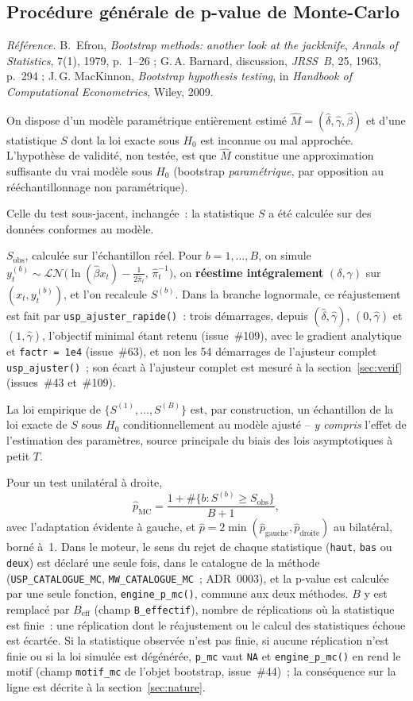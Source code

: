\documentclass[a4paper,11pt]{article}
\newcommand{\code}[1]{\texttt{\small #1}}
\newcommand{\refl}[1]{{\small\textcolor{maincolor!70!black}{\textit{Référence.} #1}}\par\smallskip}
\newcounter{ficheid}
\newenvironment{fiche}[1]{%
  \stepcounter{ficheid}%
  \phantomsection
  \subsection{#1}%
  \label{fiche:\theficheid}%
}{%
  \end{description}\vspace{0.5em}%
}
\newcommand{\Cadre}{%
  \begin{description}[leftmargin=0pt, style=unboxed, itemsep=3pt, topsep=3pt, parsep=2pt]%
  \item[\textcolor{financeblue}{\textbf{1. Cadre, notations et hypothèses de validité (non testées).}}]}
\newcommand{\Hzero}{\item[\textcolor{financeblue}{\textbf{2. Hypothèse nulle.}}]}
\newcommand{\Stat}{\item[\textcolor{financeblue}{\textbf{3. Statistique de test.}}]}
\newcommand{\Loi}{\item[\textcolor{financeblue}{\textbf{4. Loi sous $H_0$.}}]}
\newcommand{\Pval}{\item[\textcolor{financeblue}{\textbf{5. p-value.}}]}
\begin{document}
\begin{fiche}{Procédure générale de p-value de Monte-Carlo}
\label{fiche:procedure-mc}%
\refl{B.~Efron, \emph{Bootstrap methods: another look at the jackknife}, \emph{Annals of
Statistics}, 7(1), 1979, p.~1--26 ; G.\,A. Barnard, discussion, \emph{JRSS~B}, 25, 1963, p.~294 ;
J.\,G. MacKinnon, \emph{Bootstrap hypothesis testing}, in \emph{Handbook of Computational
Econometrics}, Wiley, 2009.}
\Cadre
On dispose d'un modèle paramétrique entièrement estimé
$\widehat{M} = (\hat\delta,\hat\gamma,\hat\beta)$ et d'une statistique $S$ dont la loi exacte sous
$H_0$ est inconnue ou mal approchée. L'hypothèse de validité, non testée, est que $\widehat{M}$
constitue une approximation suffisante du vrai modèle sous $H_0$ (bootstrap \emph{paramétrique},
par opposition au rééchantillonnage non paramétrique).
\Hzero
Celle du test sous-jacent, inchangée~: la statistique $S$ a été calculée sur des données conformes
au modèle.
\Stat
$S_{\text{obs}}$, calculée sur l'échantillon réel. Pour $b = 1,\dots,B$, on simule
$y_t^{(b)} \sim \mathcal{LN}\!\big(\ln(\hat\beta x_t) - \tfrac{1}{2\hat\pi_t},\, \hat\pi_t^{-1}\big)$,
on \textbf{réestime intégralement} $(\delta,\gamma)$ sur $(x_t, y_t^{(b)})$, et l'on recalcule
$S^{(b)}$. Dans la branche lognormale, ce réajustement est fait par
\code{usp\_ajuster\_rapide()}~: trois démarrages, depuis $(\hat\delta,\hat\gamma)$,
$(0,\hat\gamma)$ et $(1,\hat\gamma)$, l'objectif minimal étant retenu (issue~\#109), avec le
gradient analytique et \code{factr = 1e4} (issue~\#63), et non les 54 démarrages de l'ajusteur
complet \code{usp\_ajuster()}~; son écart à l'ajusteur complet est mesuré à la
section~\ref{sec:verif} (issues~\#43 et~\#109).
\Loi
La loi empirique de $\{S^{(1)},\dots,S^{(B)}\}$ est, par construction, un échantillon de la loi
exacte de $S$ sous $H_0$ conditionnellement au modèle ajusté -- \emph{y compris} l'effet de
l'estimation des paramètres, source principale du biais des lois asymptotiques à petit $T$.
\Pval
Pour un test unilatéral à droite,
\[
  \hat p_{\text{MC}} = \frac{1 + \#\{b : S^{(b)} \ge S_{\text{obs}}\}}{B+1},
\]
avec l'adaptation évidente à gauche, et
$\hat p = 2\min(\hat p_{\text{gauche}}, \hat p_{\text{droite}})$ au bilatéral, borné à~1.
Dans le moteur, le sens du rejet de chaque statistique (\code{haut}, \code{bas} ou
\code{deux}) est déclaré une seule fois, dans le catalogue de la méthode
(\code{USP\_CATALOGUE\_MC}, \code{MW\_CATALOGUE\_MC}~; ADR~0003), et la p-value est calculée
par une seule fonction, \code{engine\_p\_mc()}, commune aux deux méthodes. $B$ y est remplacé
par $B_{\text{eff}}$ (champ \code{B\_effectif}), nombre de réplications où la statistique est
finie~: une réplication dont le réajustement ou le calcul des statistiques échoue est écartée. Si
la statistique observée n'est pas finie, si aucune réplication n'est finie ou si la loi simulée
est dégénérée, \code{p\_mc} vaut \code{NA} et \code{engine\_p\_mc()} en rend le motif (champ
\code{motif\_mc} de l'objet bootstrap, issue~\#44)~; la conséquence sur la ligne est décrite à
la section~\ref{sec:nature}.


\end{fiche}
\end{document}
